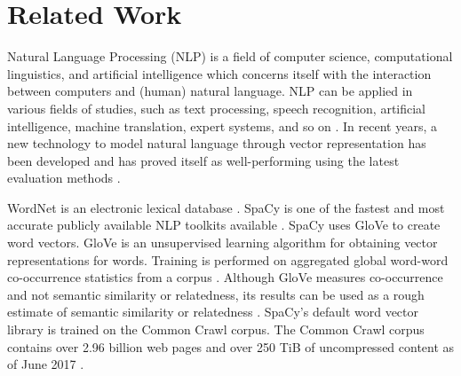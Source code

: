 \documentclass{article}
\begin{document}
\section{Related Work}

Natural Language Processing (NLP) is a field of computer science, computational linguistics, and artificial intelligence which concerns itself with the interaction between computers and (human) natural language. NLP can be applied in various fields of studies, such as text processing, speech recognition, artificial intelligence, machine translation, expert systems, and so on \citep{chowdhury2003natural}. In recent years, a new technology to model natural language through vector representation has been developed \citep{mikolov2013efficient, pennington2014glove} and has proved itself as well-performing using the latest evaluation methods \cite{schnabel2015evaluation}.


WordNet is an electronic lexical database \citep{kilgarriff2000wordnet}. %
SpaCy is one of the fastest and most accurate publicly available NLP toolkits available \citep{choi2015depends}.
SpaCy uses GloVe to create word vectors. GloVe is an unsupervised learning algorithm for obtaining vector representations for words. Training is performed on aggregated global word-word co-occurrence statistics from a corpus \citep{pennington2014glove}. Although GloVe measures co-occurrence and not semantic similarity or relatedness, its results can be used as a rough estimate of semantic similarity or relatedness \citep{levy2015improving}. SpaCy's default word vector library is trained on the Common Crawl corpus. The Common Crawl corpus contains over 2.96 billion web pages and over 250 TiB of uncompressed content as of June 2017 \citep{nagel2017commoncrawl}.
\end{document}
